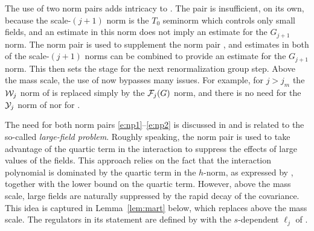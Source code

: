 The use of two norm pairs adds intricacy to \cite{BS-rg-IE,BS-rg-step}.
The pair  is insufficient, on its own, because the scale-$(j+1)$ norm
is the $T_0$ seminorm which controls only small fields, and an estimate in this norm
does not imply an estimate for the $G_{j+1}$ norm.  The norm pair  is
used to supplement the norm pair , and estimates in both of the scale-$(j+1)$
norms can be combined to provide an estimate for the $G_{j+1}$ norm.  This then
sets the stage for the next renormalization group step.  Above the mass scale,
the use of  now bypasses many issues.  For example, for $j>j_m$
 the $\mathcal{W}_j$ norm of \cite[\eqref{step-e:9Kcalnorm}]{BS-rg-step} is replaced
 simply by the $\mathcal{F}_j(G)$ norm, and there is no need for the $\mathcal{Y}_j$ norm of
\cite[\eqref{step-e:Ycaldef}]{BS-rg-step} nor for \cite[Lemma~\ref{step-lem:KKK}]{BS-rg-step}.

The need for both norm pairs \eqref{e:np1}--\eqref{e:np2} is discussed in
\cite[Section~\ref{IE-sec:lfp}]{BS-rg-IE} and is related to the
so-called \emph{large-field problem}. Roughly speaking, the
norm pair  is used to take advantage of the quartic term in the interaction to
suppress the effects of large values of the fields. This approach
relies on the fact that the interaction polynomial is dominated by the
quartic term in the $h$-norm, as expressed by
\cite[\eqref{IE-e:tau2dom}]{BS-rg-IE}, together with the lower bound
\cite[\eqref{IE-e:epVbark0}]{BS-rg-IE} on the quartic term.
However, above the mass scale, large fields are naturally suppressed
by the rapid decay of the covariance.
This idea is captured in Lemma~\ref{lem:mart} below, which replaces
\cite[Lemma~\ref{IE-lem:mart}]{BS-rg-IE} above the mass scale.
The regulators in its statement are defined by  with the $s$-dependent
$\ell_j$ of .


